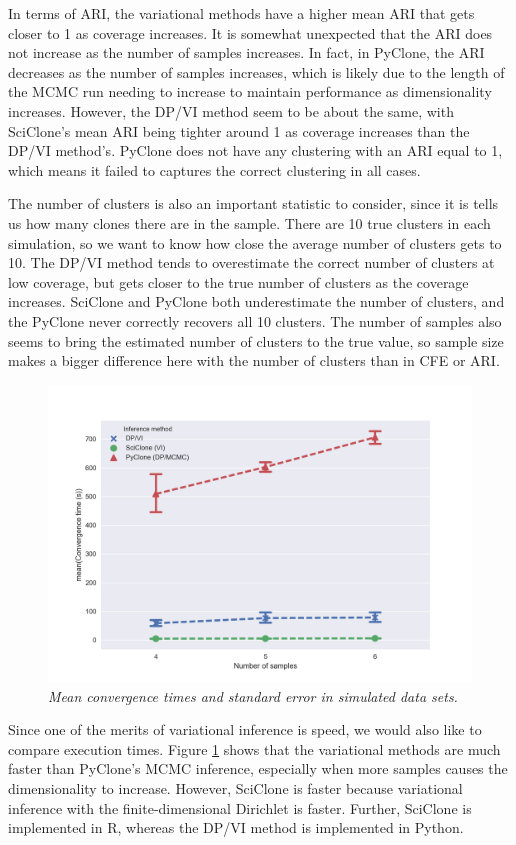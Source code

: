 \documentclass[11pt]{article}
\begin{document}
In terms of ARI, the variational methods have a higher mean ARI that gets closer to 1 as coverage increases. It is somewhat unexpected that the ARI does not increase as the number of samples increases. In fact, in PyClone, the ARI decreases as the number of samples increases, which is likely due to the length of the MCMC run needing to increase to maintain performance as dimensionality increases. However, the DP/VI method seem to be about the same, with SciClone's mean ARI being tighter around 1 as coverage increases than the DP/VI method's. PyClone does not have any clustering with an ARI equal to 1, which means it failed to captures the correct clustering in all cases.

The number of clusters is also an important statistic to consider, since it is tells us how many clones there are in the sample. There are 10 true clusters in each simulation, so we want to know how close the average number of clusters gets to 10. The DP/VI method tends to overestimate the correct number of clusters at low coverage, but gets closer to the true number of clusters as the coverage increases. SciClone and PyClone both underestimate the number of clusters, and the PyClone never correctly recovers all 10 clusters. The number of samples also seems to bring the estimated number of clusters to the true value, so sample size makes a bigger difference here with the number of clusters than in CFE or ARI.

\begin{figure}[H]
\centerline{\includegraphics[scale=0.7]{time_comparisons.png}}
\caption{\emph{Mean convergence times and standard error in simulated data sets.}}
\label{fig:SimTimes}
\end{figure}
Since one of the merits of variational inference is speed, we would also like to compare execution times. Figure \ref{fig:SimTimes} shows that the variational methods are much faster than PyClone's MCMC inference, especially when more samples causes the dimensionality to increase. However, SciClone is faster because variational inference with the finite-dimensional Dirichlet is faster. Further, SciClone is implemented in R, whereas the DP/VI method is implemented in Python.
\end{document}
